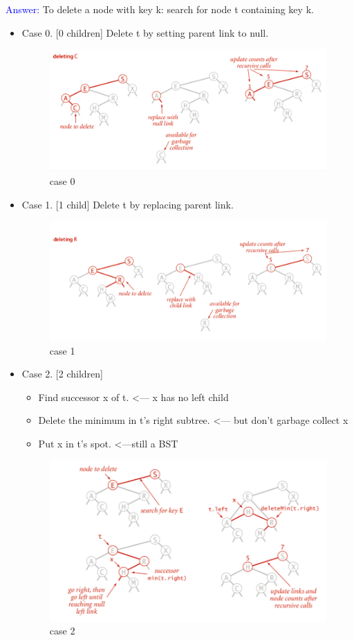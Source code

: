 \documentclass[12pt ,a4paper]{exam}
\begin{document}
\begin{enumerate}[start=1,label={\bfseries Q\arabic*)}]
		\textcolor{blue}{Answer: } To delete a node with key k: search for node t containing key k.
		\begin{itemize}
			\item  Case 0. [0 children] Delete t by setting parent link to null.
			\begin{figure}[h]
				\centering
				\includegraphics[width=0.7\linewidth]{"Screenshot 2020-12-26 at 8.38.56 AM"}
				\caption{case 0}
				\label{fig:screenshot-2020-12-26-at-8}
			\end{figure}
			\pagebreak
			\item Case 1. [1 child] Delete t by replacing parent link.
			\begin{figure}[h]
				\centering
				\includegraphics[width=0.7\linewidth]{"Screenshot 2020-12-26 at 8.39.09 AM"}
				\caption{case 1}
				\label{fig:screenshot-2020-12-26-at-8}
			\end{figure}
			
			\item Case 2. [2 children]
			\begin{itemize}
				\item Find successor x of t. <— x has no left child
				\item Delete the minimum in t’s right subtree. <— but don’t
				garbage collect x
				\item Put x in t’s spot. <—still a BST
			\end{itemize}
			\begin{figure}[h]
				\centering
				\includegraphics[width=0.7\linewidth]{"Screenshot 2020-12-26 at 8.39.22 AM"}
				\caption{case 2}
				\label{fig:screenshot-2020-12-26-at-8}
			\end{figure}
			

\end{itemize}
\end{enumerate}
\end{document}
